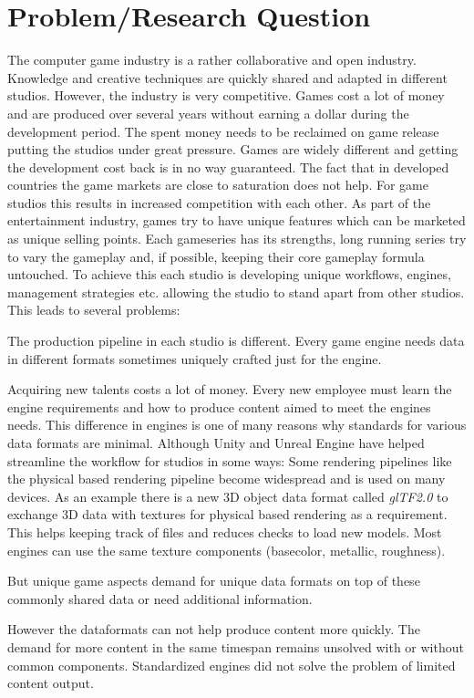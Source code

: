 \documentclass[10pt,a4paper]{article}
\begin{document}
\section{Problem/Research Question}
\begin{multicols}{2}
The computer game industry is a rather collaborative and open industry. Knowledge and creative techniques are quickly shared and adapted in different studios. However, the industry is very competitive. Games cost a lot of money and are produced over several years without earning a dollar during the development period. The spent money needs to be reclaimed on game release putting the studios under great pressure. Games are widely different and getting the development cost back is in no way guaranteed. The fact that in developed countries the game markets are close to saturation\cite{Koster2018} does not help. For game studios this results in increased competition with each other. As part of the entertainment industry, games try to have unique features which can be marketed as unique selling points. Each gameseries has its strengths, long running series try to vary the gameplay and, if possible, keeping their core gameplay formula untouched. To achieve this each studio is developing unique workflows, engines, management strategies etc. allowing the studio to stand apart from other studios. This leads to several problems: \begin{inlinelist} \item The production pipeline in each studio is different. Every game engine needs data in different formats sometimes uniquely crafted just for the engine.  \item Acquiring new talents costs a lot of money. Every new employee must learn the engine requirements and how to produce content aimed to meet the engines needs. This difference in engines is one of many reasons why standards for various data formats are minimal. Although Unity and Unreal Engine have helped streamline the workflow for studios in some ways: Some rendering pipelines like the physical based rendering pipeline become widespread and is used on many devices. As an example there is a new 3D object data format called \textit{glTF2.0} to exchange 3D data with textures for physical based rendering as a requirement\cite{TheKhronosGroup}. This helps keeping track of files and reduces checks to load new models. Most engines can use the same texture components (basecolor, metallic, roughness). \item But unique game aspects demand for unique data formats on top of these commonly shared data or need additional information. \item However the dataformats can not help produce content more quickly. The demand for more content in the same timespan remains unsolved with or without common components. Standardized engines did not solve the problem of limited content output\cite{Koster2018}.\end{inlinelist}


\end{multicols}
\end{document}
